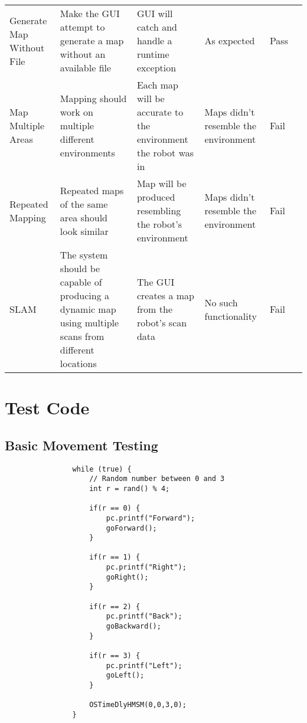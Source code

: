 \begin{landscape}
\begin{table}[h!]
\begin{tabular}{| p{2.5cm} | p{5cm} | p{4cm} | p{4cm} | p{1.5cm} | p{2cm} |}
						Generate Map Without File & Make the GUI attempt to generate a map without an available file & GUI will catch and handle a runtime exception & As expected & Pass &  \\ 
						
						Map Multiple Areas & Mapping should work on multiple different environments & Each map will be accurate to the environment the robot was in & Maps didn't resemble the environment & Fail &  \\ 
						
						Repeated Mapping & Repeated maps of the same area should look similar & Map will be produced resembling the robot's environment & Maps didn't resemble the environment & Fail &  \\ 
						
						SLAM & The system should be capable of producing a dynamic map using multiple scans from different locations & The GUI creates a map from the robot's scan data & No such functionality & Fail &  \\ [1ex] 
						\hline
					\end{tabular}	
				\end{table}
			\end{landscape}

		\section{Test Code}
		\label{testing:testcode}
			\subsection{Basic Movement Testing}
			\label{testcode:movementbasic}
			\begin{lstlisting}
				while (true) {
					// Random number between 0 and 3
					int r = rand() % 4;
					
					if(r == 0) {
						pc.printf("Forward");
						goForward();
					}
					
					if(r == 1) {
						pc.printf("Right");
						goRight();
					}
					
					if(r == 2) {
						pc.printf("Back");
						goBackward();
					}
					
					if(r == 3) {
						pc.printf("Left");
						goLeft();
					}

					OSTimeDlyHMSM(0,0,3,0);
				}
			\end{lstlisting}
			
